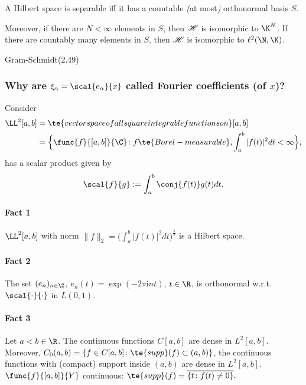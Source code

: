 \begin{thm}\label{ii.22}
    A Hilbert space is separable iff it has a countable \emph{(}at most\emph{)} orthonormal basis $S$.

    Moreover, if there are $N<\infty$ elements in $S$, then $\mathscr{H}$ is isomorphic to $\K^N$. If there are countably many elements in $S$, then $\mathscr{H}$ is isomorphic to $\ell^2(\N,\K)$.
\end{thm}

\begin{algorithm}[H]
    \begin{algorithmic}%
        \ENDFOR
    \end{algorithmic}
    \caption{Gram-Schmidt\hfill(2.49)}\label{2.49}
\end{algorithm}

\subsubsection*{Why are $\xi_\alpha=\scal{e_\alpha}{x}$ called Fourier coefficients (of $x$)?}
Consider 
\begin{align*}
    \LL^2[a,b]&=\te{vector space of all square integrable functions on }[a,b]\\
    &=\Big\{\func{f}{[a,b]}{\C}\colon f\te{ Borel-measurable},\int_a^b|f(t)|^2dt<\infty\Big\},
\end{align*}
has a scalar product given by
\[\scal{f}{g}:=\int_a^b\conj{f(t)}g(t)dt.\]
\paragraph{Fact 1}
$\LL^2[a,b]$ with norm $\|f\|_2=\big(\int_a^b|f(t)|^2dt\big)^\frac{1}{2}$ is a Hilbert space.

\paragraph{Fact 2}
The set $(e_n)_{n\in\Z}$, $e_n(t)=\exp(-2\pi \mathrm{i}nt)$, $t\in\R$, 
is orthonormal w.r.t. $\scal{\cdot}{\cdot}$ in $L(0,1)$.

\paragraph{Fact 3}
Let $a<b\in\R$. The continuous functions $C[a,b]$ are dense in $L^2[a,b]$. 
Moreover, $C_0(a,b)=\{f\in C[a,b]\colon \te{supp}(f)\subset(a,b)\}$, 
the continuous functions with (compact) support inside $(a,b)$ are dense in $L^2[a,b]$. 
 $\func{f}{[a,b]}{Y}$ continuous: $\te{supp}(f)=\overline{\{t\colon f(t)\neq0\}}.$

